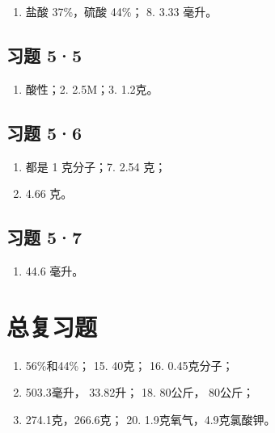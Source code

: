 \begin{enumerate}[start=7]
\item
  盐酸 37\%，硫酸 44\%； 8. 3.33 毫升。
\end{enumerate}

\subsection{习题 5·5}

\begin{enumerate}
\item
  酸性；2. 2.5M；3. 1.2克。
\end{enumerate}

\subsection{习题 5·6}

\begin{enumerate}[start=6]
\item
  都是 1 克分子；7. 2.54 克；
\item
  4.66 克。
\end{enumerate}

\subsection{习题 5·7}

\begin{enumerate}[start=6]
\item
  44.6 毫升。
\end{enumerate}

\section{总复习题}

\begin{enumerate}[start=13]
\item
  56\%和44\%； 15. 40克； 16. 0.45克分子；
\item
  503.3毫升， 33.82升； 18. 80公斤， 80公斤；
\item
  274.1克，266.6克； 20. 1.9克氧气，4.9克氯酸钾。
\end{enumerate}
